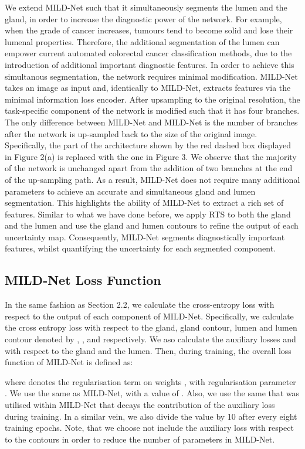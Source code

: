 \documentclass[3p]{elsarticle}
\begin{document}
We extend MILD-Net such that it simultaneously segments the lumen and the gland, in order to increase the diagnostic power of the network. For example, when the grade of cancer increases, tumours tend to become solid and lose their lumenal properties. Therefore, the additional segmentation of the lumen can empower current automated colorectal cancer classification methods, due to the introduction of additional important diagnostic features. In order to achieve this simultanous segmentation, the network requires minimal modification. MILD-Net takes an image as input and, identically to MILD-Net, extracts features via the minimal information loss encoder. After upsampling to the original resolution, the task-specific component of the network is modified such that it has four branches. The only difference between MILD-Net and MILD-Net is the number of branches after the network is up-sampled back to the size of the original image. Specifically, the part of the architecture shown by the red dashed box displayed in Figure 2(a) is replaced with the one in Figure 3. We observe that the majority of the network is unchanged apart from the addition of two branches at the end of the up-sampling path. As a result, MILD-Net does not require many additional parameters to achieve an accurate and simultaneous gland and lumen segmentation. This highlights the ability of MILD-Net to extract a rich set of features. Similar to what we have done before, we apply RTS to both the gland and the lumen and use the gland and lumen contours to refine the output of each uncertainty map. Consequently, MILD-Net segments diagnostically important features, whilst quantifying the uncertainty for each segmented component.

\subsection{MILD-Net Loss Function}

In the same fashion as Section 2.2, we calculate the cross-entropy loss with respect to the output of each component of MILD-Net. Specifically, we calculate the cross entropy loss with respect to the gland, gland contour, lumen and lumen contour denoted by , ,  and  respectively. We aso calculate the auxiliary losses  and  with respect to the gland and the lumen. Then, during training, the overall loss function of MILD-Net is defined as:


\noindent where  denotes the regularisation term on weights , with regularisation parameter . We use the same  as MILD-Net, with a value of . Also, we use the same  that was utilised within MILD-Net that decays the contribution of the auxiliary loss during training. In a similar vein, we also divide the value by 10 after every eight training epochs. Note, that we choose not include the auxiliary loss with respect to the contours in order to reduce the number of parameters in MILD-Net.
\end{document}
